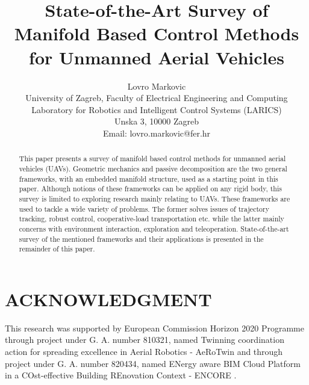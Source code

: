 \documentclass[letterpaper, 10 pt, conference]{ieeeconf}  %
\title{\LARGE \bf
State-of-the-Art Survey of Manifold Based Control Methods for Unmanned Aerial Vehicles
}
\author{Lovro Markovic \\
	University of Zagreb, Faculty of Electrical Engineering and Computing \\
	Laboratory for Robotics and Intelligent Control Systems (LARICS) \\
	Unska 3, 10000 Zagreb \\
	Email: lovro.markovic@fer.hr
}
\begin{document}
\maketitle

\thispagestyle{empty}
\pagestyle{empty}


\begin{abstract}
This paper presents a survey of manifold based control methods for unmanned aerial vehicles (UAVs). 
Geometric mechanics and passive decomposition are the two general frameworks, with an embedded manifold structure, used as a starting point in this paper. Although notions of these frameworks can be applied on any rigid body, this survey is limited to exploring research mainly relating to UAVs. These frameworks are used to tackle a wide variety of problems. The former solves issues of trajectory tracking, robust control, cooperative-load transportation etc. while the latter mainly concerns with environment interaction, exploration and teleoperation. State-of-the-art survey of the mentioned frameworks and their applications is presented in the remainder of this paper.
\end{abstract}





%


\section*{ACKNOWLEDGMENT}

This research was supported by European Commission Horizon 2020 Programme through project under G. A. number 810321, named Twinning coordination action for spreading excellence in Aerial Robotics - AeRoTwin \cite{AEROTWINweb} and through project under G. A. number 820434, named ENergy aware BIM Cloud Platform in a COst-effective Building REnovation Context - ENCORE \cite{ENCOREweb}.



\end{document}
